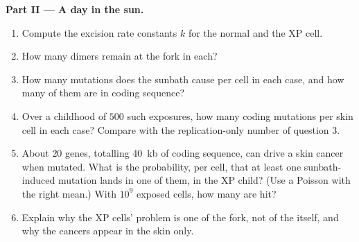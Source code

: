 \begin{problem}
\medskip
\noindent\textbf{Part II --- A day in the sun.}
\begin{enumerate}[resume]
  \item Compute the excision rate constants $k$ for the normal and the
        XP cell.
  \item How many dimers remain at the fork in each?
  \item How many mutations does the sunbath cause per cell in each
        case, and how many of them are in coding sequence?
  \item Over a childhood of $500$ such exposures, how many coding
        mutations per skin cell in each case? Compare with the
        replication-only number of question 3.
  \item About $20$ genes, totalling \qty{40}{kb} of coding sequence,
        can drive a skin cancer when mutated. What is the probability,
        per cell, that at least one sunbath-induced mutation lands in
        one of them, in the XP child? (Use a Poisson with the right
        mean.) With $10^{9}$ exposed cells, how many are hit?
  \item Explain why the XP cells' problem is one of the fork, not of
        the  itself, and why the cancers appear in the skin only.
\end{enumerate}


\end{problem}
